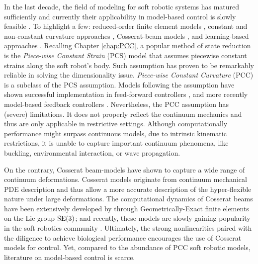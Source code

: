 In the last decade, the field of modeling for soft robotic systems has matured sufficiently and currently their applicability in model-based control is slowly feasible \cite{DellaSantina2021}. To highlight a few: reduced-order finite element models \cite{Duriez2013,Zhang2017,Wu2021}, constant and non-constant curvature approaches \cite{Katzschmann2019,DellaSantina2020}, Cosserat-beam models \cite{Renda2020,Boyer2021}, and learning-based approaches \cite{Bruder2019}. 
Recalling Chapter \ref{chap:PCC}, a popular method of state reduction is the \textit{Piece-wise Constant Strain} (PCS) model that assumes piecewise constant strains along the soft robot's body. Such assumption has proven to be remarkably reliable in solving the dimensionality issue. \textit{Piece-wise Constant Curvature} (PCC) is a subclass of the PCS assumption. Models following the assumption have shown successful implementation in feed-forward controllers \cite{Falkenhahn2015}, and more recently model-based feedback controllers \cite{DellaSantina2020,Katzschmann2019}. Nevertheless, the PCC assumption has (severe) limitations. It does not properly reflect the continuum mechanics and thus are only applicable in restrictive settings. Although computationally performance might surpass continuous models, due to intrinsic kinematic restrictions, it is unable to capture important continuum phenomena, like buckling, environmental interaction, or wave propagation.

On the contrary, Cosserat beam-models have shown to capture a wide range of continuum deformations. Cosserat models originate from continuum mechanical PDE description and thus allow a more accurate description of the hyper-flexible nature under large deformations. The computational dynamics of Cosserat beams have been extensively developed by \cite{Simo1986} through Geometrically-Exact finite elements on the Lie group $\textup{\textrm{SE}}(3)$; and recently, these models are slowly gaining popularity in the soft robotics community \cite{Renda2018,Renda2020,Boyer2021,Till2019,Gazzola2018}. Ultimately, the strong nonlinearities paired with the diligence to achieve biological performance encourages the use of Cosserat models for control. Yet, compared to the abundance of PCC soft robotic models, literature on model-based control is scarce.


